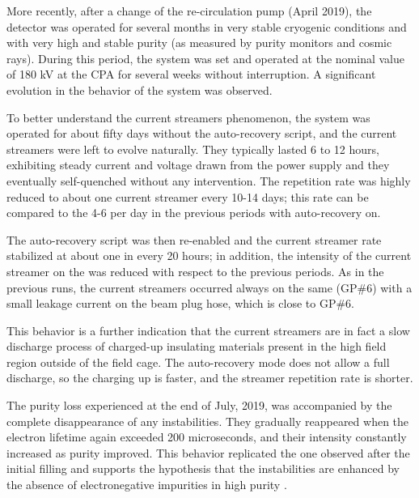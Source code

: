 More recently, after a change of the  re-circulation pump (April 2019), the detector was operated for several months in very stable cryogenic conditions and with very high and stable  purity (as measured by purity monitors and cosmic rays). During this period, the  system was set and operated at the nominal value of 180 kV at the CPA for several weeks without interruption. A significant evolution in the behavior of the  system was observed. 

To better understand the current streamers phenomenon, the  system was operated for about fifty days without the auto-recovery script, and the current streamers were left to evolve naturally. They typically lasted 6 to 12 hours, exhibiting steady current and voltage drawn from the  power supply and they eventually self-quenched without any intervention. The repetition rate was highly reduced to about one current streamer every 10-14 days; this rate can be compared to the 4-6 per day in the previous periods with auto-recovery on.

The auto-recovery script was then re-enabled and the current streamer rate stabilized at about one in every 20 hours; in addition, the intensity of the current streamer on the  was reduced with respect to the previous periods. As in the previous runs, the current streamers occurred always on the same  (GP\#6) with a small leakage current on the beam plug hose, which is close to GP\#6. 

This behavior is a further indication that the current streamers are in fact a slow discharge process of charged-up insulating materials present in the high field region outside of the field cage. The auto-recovery mode does not allow a full discharge, so the charging up is faster, and the streamer repetition rate is shorter.

The  purity loss experienced at the end of July, 2019, was accompanied by the complete disappearance of any  instabilities. 
They gradually reappeared when the electron lifetime again exceeded 200 microseconds, and their intensity constantly increased as purity improved. This behavior replicated the one observed after the initial filling and supports the hypothesis that the  instabilities are enhanced by the absence of electronegative impurities in high purity .

